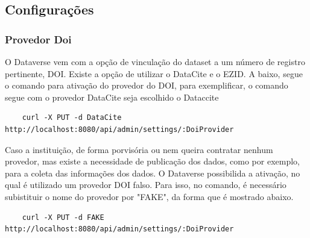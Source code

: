 \documentclass[12pt,hidelinks]{article}
\begin{document}
        \subsection{Configurações}
        
        \subsubsection{Provedor Doi }
        
    O Dataverse vem com a opção de vinculação do dataset a um número de registro pertinente, DOI. Existe a opção de utilizar o DataCite e o EZID. A baixo, segue o comando para ativação do provedor do DOI, para exemplificar, o comando segue com o provedor DataCite seja escolhido o Dataccite
        \begin{verbatim}
    curl -X PUT -d DataCite http://localhost:8080/api/admin/settings/:DoiProvider
        \end{verbatim}
        
        Caso a instituição, de forma porvisória ou nem queira contratar nenhum provedor, mas existe a necessidade de publicação dos dados, como por exemplo, para a coleta das informações dos dados. O Dataverse possibilida a ativação, no qual é utilizado um provedor DOI falso. Para isso, no comando, é necessário subistituir o nome do provedor por "FAKE", da forma que é mostrado abaixo.
        
        \begin{verbatim}
    curl -X PUT -d FAKE http://localhost:8080/api/admin/settings/:DoiProvider
        \end{verbatim}
        
        
\end{document}
